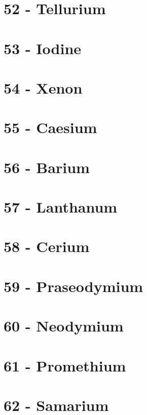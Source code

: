 \documentclass{book}
\begin{document}
\section{52 - Tellurium}
\label{sec:elem-tellurium}

\section{53 - Iodine}
\label{sec:elem-iodine}

\section{54 - Xenon}
\label{sec:elem-xenon}

\section{55 - Caesium}
\label{sec:elem-caesium}

\section{56 - Barium}
\label{sec:elem-barium}

\section{57 - Lanthanum}
\label{sec:elem-lanthanum}

\section{58 - Cerium}
\label{sec:elem-cerium}

\section{59 - Praseodymium}
\label{sec:elem-praseodymium}

\section{60 - Neodymium}
\label{sec:elem-neodymium}

\section{61 - Promethium}
\label{sec:elem-promethium}

\section{62 - Samarium}
\label{sec:elem-samarium}
\end{document}
